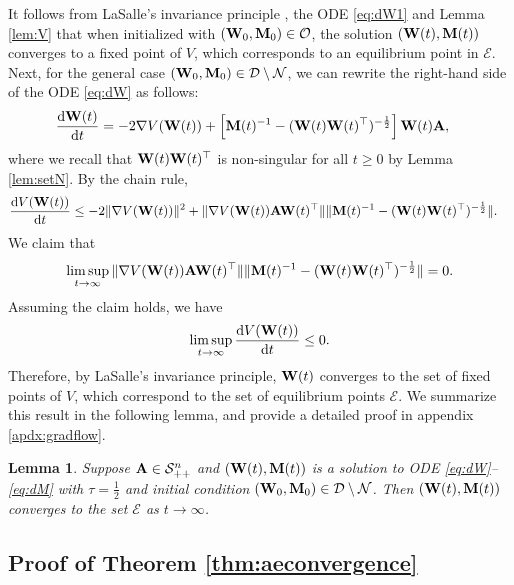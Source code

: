 \documentclass[11pt]{article}
\newtheorem{lemma}{Lemma}
\theoremstyle{definition}
\newcommand{\dd}{\operatorname{d}\!}
\newcommand{\A}{{\bf A}}
\newcommand{\M}{{\bf M}}
\newcommand{\W}{{\bf W}}
\newcommand{\calD}{\mathcal{D}}
\newcommand{\calE}{\mathcal{E}}
\newcommand{\calN}{\mathcal{N}}
\newcommand{\calO}{\mathcal{O}}
\newcommand{\calS}{\mathcal{S}}
\begin{document}
It follows from LaSalle's invariance principle \citep{lasalle1968stability}, the ODE \eqref{eq:dW1} and Lemma \ref{lem:V} that when initialized  with $(\W_0,\M_0)\in\calO$, the solution $(\W(t),\M(t))$ converges to a fixed point of $V$, which corresponds to an equilibrium point in $\calE$. Next, for the general case $(\W_0,\M_0)\in\calD\setminus\calN$, we can rewrite the right-hand side of the ODE \eqref{eq:dW} as follows:
\begin{align*}
    \frac{\dd \W(t)}{\dd t}&=-2\nabla V(\W(t))+\left[\M(t)^{-1}-(\W(t)\W(t)^\top)^{-\frac12}\right]\W(t)\A,
\end{align*}
where we recall that $\W(t)\W(t)^\top$ is non-singular for all $t\ge0$ by Lemma \ref{lem:setN}. By the chain rule,
\begin{align*}%
    \frac{\dd V(\W(t))}{\dd t}&\le-2\|\nabla V(\W(t))\|^2+\|\nabla V(\W(t))\A\W(t)^\top\|\|\M(t)^{-1}-(\W(t)\W(t)^\top)^{-\frac12}\|.
\end{align*}
We claim that
\begin{align*}
    \limsup_{t\to\infty}\|\nabla V(\W(t))\A\W(t)^\top\|\|\M(t)^{-1}-(\W(t)\W(t)^\top)^{-\frac12}\|=0.
\end{align*}
Assuming the claim holds, we have
\begin{align*}
    \limsup_{t\to\infty}\frac{\dd V(\W(t))}{\dd t}\le0.
\end{align*}
Therefore, by LaSalle's invariance principle, $\W(t)$ converges to the set of fixed points of $V$, which correspond to the set of equilibrium points $\calE$. We summarize this result in the following lemma, and provide a detailed proof in appendix \ref{apdx:gradflow}.
    
\begin{lemma}\label{lem:globalconv}
    Suppose $\A\in\calS_{++}^n$ and $(\W(t),\M(t))$ is a solution to ODE \eqref{eq:dW}--\eqref{eq:dM} with  $\tau=\frac12$ and initial condition $(\W_0,\M_0)\in\calD\setminus\calN$. Then $(\W(t),\M(t))$ converges to the set $\calE$ as $t\to\infty$. 
\end{lemma}
 
\subsection{Proof of Theorem \ref{thm:aeconvergence}}\label{sec:proof}
\end{document}
